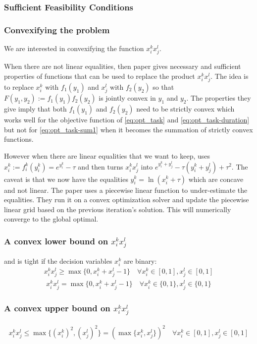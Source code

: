 \subsubsection{Sufficient Feasibility Conditions} \todo{}

\subsubsection{Convexifying the problem}

We are interested in convexifying the function $x_i^kx_j^l$.

When there are not linear equalities, then paper \cite{gounaris2008convexity} gives necessary and sufficient properties of functions that can be used to replace the product $x_i^kx_j^l$.
The idea is to replace $x_i^k$ with $f_1(y_1)$ and $x_j^l$ with $f_2(y_2)$ so that $F(y_1,y_2):=f_1(y_1)f_2(y_2)$ is jointly convex in $y_1$ and $y_2$.
The properties they give imply that both $f_1(y_1)$ and $f_2(y_2)$ need to be strictly convex which works well for the objective function of \eqref{eq:opt_task} and \eqref{eq:opt_task-duration} but not for \eqref{eq:opt_task-sum1} when it becomes the summation of strictly convex functions.

However when there are linear equalities that we want to keep, \cite{porn2008global} uses $x_i^k:= f_i^k(y_i^k) = e^{y_i^k}-\tau$ and then turns $x_i^kx_j^l$ into $e^{y_i^k+y_j^l}-\tau(y_i^k+y_j^l)+\tau^2$.
The caveat is that we now have the equalities $y_i^k=\ln (x_i^k+\tau)$ which are concave and not linear.
The paper uses a piecewise linear function to under-estimate the equalities.
They run it on a convex optimization solver and update the piecewise linear grid based on the previous iteration's solution.
This will numerically converge to the global optimal.

\subsubsection{A convex lower bound on $x_i^kx_j^l$} and is tight if the decision variables $x_i^k$ are binary:
\begin{align}
	x_i^kx_j^l \geq \max\{0,x_i^k+x_j^l-1\} \quad \forall x_i^k\in[0,1],x_j^l\in[0,1]
\end{align}
\begin{align}
	x_i^kx_j^l = \max\{0,x_i^k+x_j^l-1\} \quad \forall x_i^k\in\{0,1\},x_j^l\in\{0,1\}
\end{align}

\subsubsection{A convex upper bound on $x_i^kx_j^l$}
\begin{align}
	x_i^kx_j^l \leq \max\{(x_i^k)^2,(x_j^l)^2\}=(\max\{x_i^k,x_j^l\})^2 \quad \forall x_i^k\in[0,1],x_j^l\in[0,1]
\end{align}


